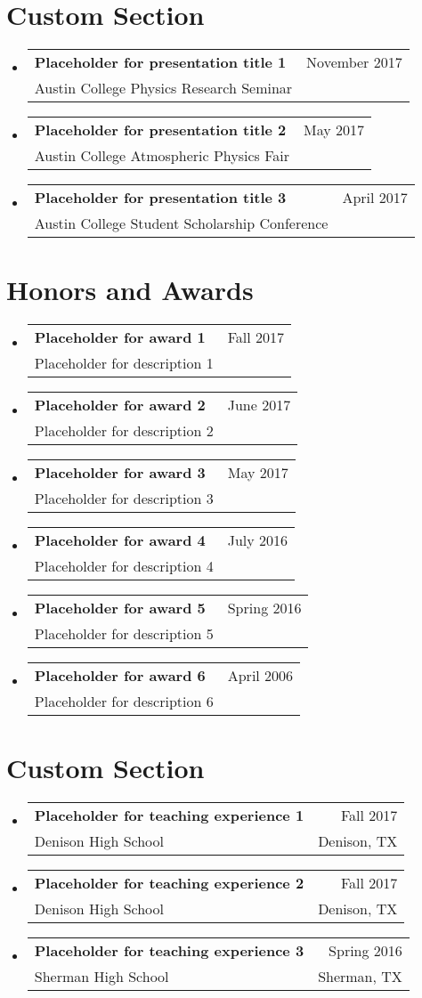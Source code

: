 \documentclass[A4,11pt]{article}
\makeatletter
\newcommand{\CVSubheading}[4]{
  \vspace{-2pt}\item
    \begin{tabular*}{0.97\textwidth}[t]{l@{\extracolsep{\fill}}r}
      \textbf{#1} & #2 \\
      \small#3 & \small #4 \\
    \end{tabular*}\vspace{-7pt}
}
\newcommand{\CVSubHeadingListStart}{\begin{itemize}[leftmargin=0.5cm, label={}]}
\newcommand{\CVSubHeadingListEnd}{\end{itemize}}
\makeatother
\begin{document}
\begin{comment}
Again the title should have already been enough, but if it is necessary to add
descriptions maintain the consistency from prior sections
\end{comment}

\section{Custom Section}
  \CVSubHeadingListStart
    \CVSubheading
      {Placeholder for presentation title 1}{November 2017}
      {Austin College Physics Research Seminar}{}
    \CVSubheading
      {Placeholder for presentation title 2}{May 2017}
      {Austin College Atmospheric Physics Fair}{}
    \CVSubheading
      {Placeholder for presentation title 3}{April 2017}
      {Austin College Student Scholarship Conference}{}
  \CVSubHeadingListEnd

\section{Honors and Awards}
  \CVSubHeadingListStart
    \CVSubheading
      {Placeholder for award 1}{Fall 2017}
      {Placeholder for description 1}{}
    \CVSubheading
      {Placeholder for award 2}{June 2017}
      {Placeholder for description 2}{}
    \CVSubheading
      {Placeholder for award 3}{May 2017}
      {Placeholder for description 3}{}
    \CVSubheading
      {Placeholder for award 4}{July 2016}
      {Placeholder for description 4}{}
    \CVSubheading
      {Placeholder for award 5}{Spring 2016}
      {Placeholder for description 5}{}
    \CVSubheading
      {Placeholder for award 6}{April 2006}
      {Placeholder for description 6}{}
  \CVSubHeadingListEnd

\begin{comment}
Section is here as it applied to my application for positions in academia. 
Remember to tailor the resume for to the position.
\end{comment}

\section{Custom Section}
  \CVSubHeadingListStart
    \CVSubheading
      {Placeholder for teaching experience 1}{Fall 2017}
      {Denison High School}{Denison, TX}
    \CVSubheading
      {Placeholder for teaching experience 2}{Fall 2017}
      {Denison High School}{Denison, TX}
    \CVSubheading
      {Placeholder for teaching experience 3}{Spring 2016}
      {Sherman High School}{Sherman, TX}
  \CVSubHeadingListEnd
\end{document}
